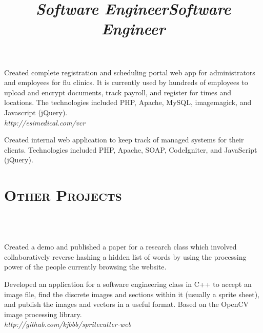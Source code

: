 \documentclass[line,margin]{resume}
\begin{document}
\begin{resume}
\title{\textit{Software Engineer}}
\begin{position}
Created complete registration and scheduling portal web app for administrators
and employees for flu clinics. It is currently used by hundreds of employees to
upload and encrypt documents, track payroll, and register for times and
locations. The technologies included PHP, Apache, MySQL, imagemagick, and
Javascript (jQuery).
\\ {\itshape http://esimedical.com/vcr}
\end{position}

\title{\textit{Software Engineer}}
\begin{position}
Created internal web application to keep track of managed systems for their
clients. Technologies included PHP, Apache, SOAP, CodeIgniter, and JavaScript
(jQuery).
\end{position}

\section{\textsc{Other Projects}}

\begin{format}
  \\
  \body\\
\end{format}

\begin{position}
Created a demo and published a paper for a research class which involved
collaboratively reverse hashing a hidden list of words by using the processing
power of the people currently browsing the website.
\end{position}

\begin{position}
Developed an application for a software engineering class in C++ to accept an
image file, find the discrete images and sections within it (usually a sprite
sheet), and publish the images and vectors in a useful format. Based on the
OpenCV image processing library. \\
{\itshape http://github.com/kjbbb/spritecutter-web}
\end{position}


\end{resume}
\end{document}
